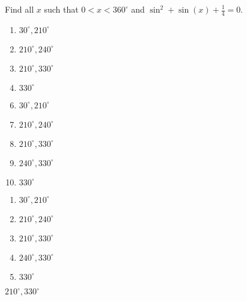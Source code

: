 


  Find all $x$ such that $0<x<360^\circ$ and $\sin^{2}+\sin(x)+\frac{1}{4}=0$.


\ifsat
	\begin{enumerate}[label=\Alph*)]
		\item    $30^\circ, 210^\circ$
		\item  $210^\circ, 240^\circ$ 
		\item $210^\circ, 330^\circ $ %
		\item  $330^\circ$
	\end{enumerate}
\else
\fi

\ifacteven
	\begin{enumerate}[label=\textbf{\Alph*.},itemsep=\fill,align=left]
		\setcounter{enumii}{5}
		\item    $30^\circ, 210^\circ$
		\item  $210^\circ, 240^\circ$ 
		\item $210^\circ, 330^\circ $ %
		\addtocounter{enumii}{1}
		\item $240^\circ, 330^\circ$ 
		\item  $330^\circ$
	\end{enumerate}
\else
\fi

\ifactodd
	\begin{enumerate}[label=\textbf{\Alph*.},itemsep=\fill,align=left]
		\item    $30^\circ, 210^\circ$
		\item  $210^\circ, 240^\circ$ 
		\item $210^\circ, 330^\circ $ %
		\item $240^\circ, 330^\circ$ 
		\item  $330^\circ$
	\end{enumerate}
\else
\fi

\ifgridin
 $210^\circ, 330^\circ $ %
		
\else
\fi


